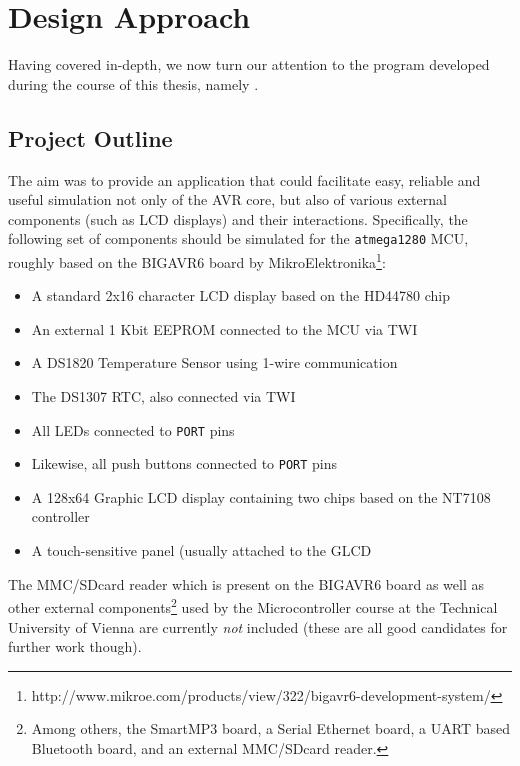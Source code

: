 
\chapter{Design Approach} \label{chapter:designapproach}

Having covered \simavr in-depth, we now turn our attention to the program developed
during the course of this thesis, namely \qsimavr.

\section{Project Outline} \label{section:project_outline}

The aim was to provide an application that could facilitate easy, reliable and
useful simulation not only of the \ac{AVR} core, but also of various external
components (such as \ac{LCD} displays) and their interactions. Specifically,
the following set of components should be simulated for the \verb|atmega1280|
\ac{MCU}, roughly based on the BIGAVR6 board by MikroElektronika\footnote{
%
http://www.mikroe.com/products/view/322/bigavr6-development-system/
%
}:

\begin{itemize}
\item A standard 2x16 character \ac{LCD} display based on the HD44780 chip
\item An external 1 Kbit \ac{EEPROM} connected to the \ac{MCU} via \ac{TWI}
\item A DS1820 Temperature Sensor using 1-wire communication
\item The DS1307 \ac{RTC}, also connected via \ac{TWI}
\item All \acp{LED} connected to \verb|PORT| pins
\item Likewise, all push buttons connected to \verb|PORT| pins
\item A 128x64 Graphic \ac{LCD} display containing two chips based on the NT7108 controller
\item A touch-sensitive panel (usually attached to the \ac{GLCD}
\end{itemize}

The MMC/SDcard reader which is present on the BIGAVR6 board as well as
other external components\footnote{
%
Among others, the SmartMP3 board, a Serial Ethernet board, a \ac{UART} based
Bluetooth board, and an external MMC/SDcard reader.
%
} used by the Microcontroller course at the Technical
University of Vienna are currently \emph{not} included (these are all good
candidates for further work though).

